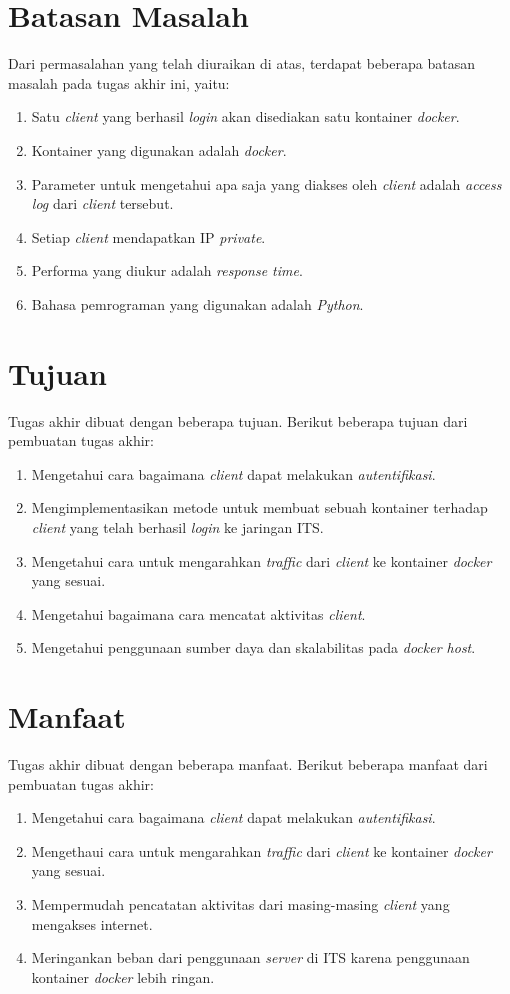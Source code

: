 \section{Batasan Masalah}
Dari permasalahan yang telah diuraikan di atas, terdapat beberapa batasan masalah pada tugas akhir ini, yaitu:
\begin{enumerate}
	\item Satu \textit{client} yang berhasil \textit{login} akan disediakan satu kontainer \textit{docker}.
	\item Kontainer yang digunakan adalah \textit{docker}.
	\item Parameter untuk mengetahui apa saja yang diakses oleh \textit{client} adalah \textit{access log} dari \textit{client} tersebut.
	\item Setiap \textit{client} mendapatkan IP \textit{private}.
	\item Performa yang diukur adalah \textit{response time}.
	\item Bahasa pemrograman yang digunakan adalah \textit{Python}.
\end{enumerate}

\section{Tujuan}
Tugas akhir dibuat dengan beberapa tujuan. Berikut beberapa tujuan dari pembuatan tugas akhir:
\begin{enumerate}
	\item Mengetahui cara bagaimana \textit{client} dapat melakukan \textit{autentifikasi}.
	\item Mengimplementasikan metode untuk membuat sebuah kontainer terhadap \textit{client} yang telah berhasil \textit{login} ke jaringan ITS.
	\item Mengetahui cara untuk mengarahkan \textit{traffic} dari \textit{client} ke kontainer \textit{docker} yang sesuai.
	\item Mengetahui bagaimana cara mencatat aktivitas \textit{client}.
	\item Mengetahui penggunaan sumber daya dan skalabilitas pada \textit{docker host}.
\end{enumerate}

\section{Manfaat}
Tugas akhir dibuat dengan beberapa manfaat. Berikut beberapa manfaat dari pembuatan tugas akhir:
\begin{enumerate}
	\item Mengetahui cara bagaimana \textit{client} dapat melakukan \textit{autentifikasi}.
	\item Mengethaui cara untuk mengarahkan \textit{traffic} dari \textit{client} ke kontainer \textit{docker} yang sesuai.
	\item Mempermudah pencatatan aktivitas dari masing-masing \textit{client} yang mengakses internet.
	\item Meringankan beban dari penggunaan \textit{server} di ITS karena penggunaan kontainer \textit{docker} lebih ringan.
\end{enumerate}      

